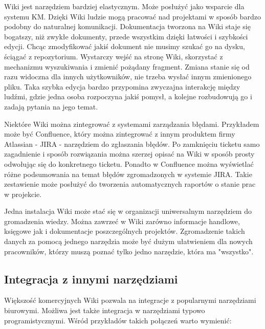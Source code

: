 \documentclass{article}
\begin{document}
	Wiki jest narzędziem bardziej elastycznym. Może posłużyć jako wsparcie dla systemu KM. Dzięki Wiki ludzie mogą pracować nad projektami w sposób bardzo podobny do naturalnej komunikacji. Dokumentacja tworzona na Wiki staje się bogatszy, niż zwykłe dokumenty, przede wszystkim dzięki łatwości i szybkości edycji. Chcąc zmodyfikować jakiś dokument nie musimy szukać go na dysku, ściągać z repozytorium. Wystarczy wejść na stronę Wiki, skorzystać z mechanizmu wyszukiwania i zmienić pożądany fragment. Zmiana stanie się od razu widoczna dla innych użytkowników, nie trzeba wysłać innym zmienionego pliku. Taka szybka edycja bardzo przypomina zwyczajna interakcję między ludźmi, gdzie jedna osoba rozpoczyna jakiś pomysł, a kolejne rozbudowują go i zadają pytania na jego temat.

	Niektóre Wiki można zintegrować z systemami zarządzania błędami. Przykładem może być Confluence, który można zintegrować z innym produktem firmy Atlassian - JIRA - narzędziem do zgłaszania błędów. Po zamknięciu ticketu samo zagadnienie i sposób rozwiązania można szerzej opisać na Wiki w sposób prosty odwołując się do konkretnego ticketu. Ponadto w Confluence można wyświetlać różne podsumowania na temat błędów zgromadzonych w systemie JIRA. Takie zestawienie może posłużyć do tworzenia automatycznych raportów o stanie prac w projekcie.

	Jedna instalacja Wiki może stać się w organizacji uniwersalnym narzędziem do gromadzenia wiedzy. Można zawrzeć w Wiki zarówno informacje handlowe, księgowe jak i dokumentacje poszczególnych projektów. Zgromadzenie takich danych za pomocą jednego narzędzia może być dużym ułatwieniem dla nowych pracowników, którzy muszą poznać tylko jedno narzędzie, która ma "wszystko". 



	\subsection{Integracja z innymi narzędziami}

	Większość komercyjnych Wiki pozwala na integracje z popularnymi narzędziami biurowymi. Możliwa jest także integracja w narzędziami typowo programistycznymi. Wśród przykładów takich połączeń warto wymienić:
\end{document}
